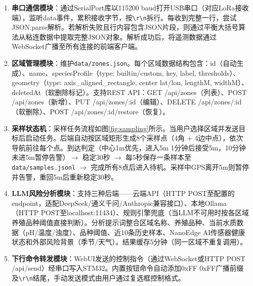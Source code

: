 \documentclass[12pt,a4paper]{ctexart}
\begin{document}
\begin{enumerate}[label=\arabic*.]
    \item \textbf{串口通信模块}：通过SerialPort库以115200 baud打开USB串口（对应LoRa接收端），监听data事件，累积接收字节，按\texttt{\textbackslash r\textbackslash n}拆行。每收到完整一行，尝试JSON.parse解析。若解析失败且行内容包含JSON片段，则通过平衡大括号算法从粘连数据中提取完整JSON对象。解析成功后，将遥测数据通过WebSocket广播至所有连接的前端客户端。

    \item \textbf{区域管理模块}：维护\texttt{data/zones.json}。每个区域数据结构包含：id（自动生成）、name、speciesProfile（type: builtin/custom, key, label, thresholds）、geometry（type: axis\_aligned\_rectangle, center lat/lon, lengthM, widthM）、deletedAt（软删除标记）。支持REST API：GET /api/zones（列表）、POST /api/zones（新增）、PUT /api/zones/:id（编辑）、DELETE /api/zones/:id（软删除）、POST /api/zones/:id/restore（恢复）。

    \item \textbf{采样状态机}：采样任务流程如图\ref{fig:sampling}所示。当用户选择区域并发送目标后启动任务。后端自动按区域矩形生成8个采样点（4角 + 4边中点），依次导航前往每个点。到达判定（中心1m优先，进入5m 1分钟后接受5m，10分钟未进5m暂停告警）$\rightarrow$ 稳定30秒 $\rightarrow$ 每5秒保存一条样本至\texttt{data/samples.jsonl} $\rightarrow$ 完成所有8点后进入待机。采样中GPS离开5m则暂停并告警，重回5m后重新稳定30秒。

    \item \textbf{LLM风险分析模块}：支持三种后端——云端API（HTTP POST至配置的endpoint，适配DeepSeek/通义千问/Anthropic兼容接口）、本地Ollama（HTTP POST至localhost:11434）、规则引擎兜底（当LLM不可用时按各区域养殖品种阈值直接判断）。分析提示词整合区域名称、养殖品种、当前水质数据（pH/温度/浊度）、品种阈值、近10条历史样本、NanoEdge AI传感器健康状态和外部风险背景（季节/天气）。结果缓存5分钟（同一区域不重复调用）。

    \item \textbf{下行命令转发模块}：WebUI发送的控制指令（通过WebSocket或HTTP POST /api/send）经串口写入STM32。内置按钮命令自动添加0xFF 0xFF广播前缀及\texttt{\textbackslash r\textbackslash n}结尾，手动发送模式由用户通过复选框控制格式。
\end{enumerate}
\end{document}
